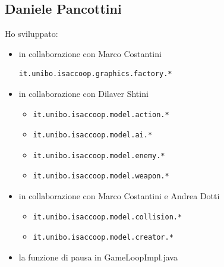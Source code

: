 \documentclass[a4paper,12pt]{report}
\begin{document}
\subsection*{Daniele Pancottini}
Ho sviluppato:
\begin{itemize}
    \item in collaborazione con Marco Costantini \begin{verbatim}it.unibo.isaccoop.graphics.factory.* \end{verbatim}
    \item in collaborazione con Dilaver Shtini 
    \begin{itemize}
        \item \begin{verbatim}it.unibo.isaccoop.model.action.* \end{verbatim}
        \item \begin{verbatim}it.unibo.isaccoop.model.ai.* \end{verbatim}
        \item \begin{verbatim}it.unibo.isaccoop.model.enemy.* \end{verbatim}
        \item \begin{verbatim}it.unibo.isaccoop.model.weapon.* \end{verbatim}
    \end{itemize}
    \item in collaborazione con Marco Costantini e Andrea Dotti
    \begin{itemize}
        \item \begin{verbatim}it.unibo.isaccoop.model.collision.* \end{verbatim}
        \item \begin{verbatim}it.unibo.isaccoop.model.creator.* \end{verbatim}
    \end{itemize}
    \item la funzione di pausa in GameLoopImpl.java
\end{itemize}
\end{document}
